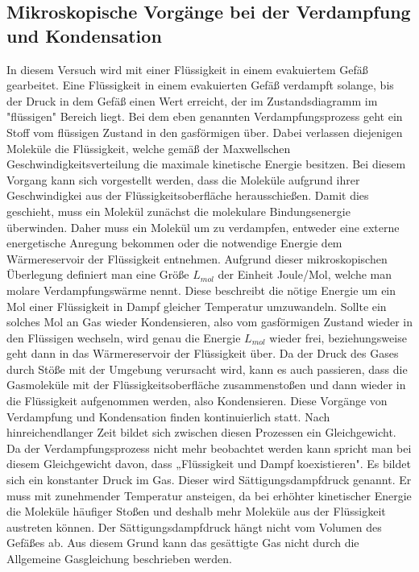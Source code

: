 \subsection{Mikroskopische Vorgänge bei der Verdampfung und Kondensation}
\label{subsec:T_VK}
In diesem Versuch wird mit einer Flüssigkeit in einem evakuiertem Gefäß gearbeitet. Eine Flüssigkeit in einem evakuierten Gefäß verdampft solange, bis der Druck in dem Gefäß einen Wert erreicht,
der im Zustandsdiagramm im "flüssigen"\: Bereich liegt. Bei dem eben genannten Verdampfungsprozess
geht ein Stoff vom flüssigen Zustand in den gasförmigen über. Dabei verlassen diejenigen Moleküle die Flüssigkeit, welche gemäß der Maxwellschen Geschwindigkeitsverteilung die maximale kinetische 
Energie besitzen. Bei diesem Vorgang kann sich vorgestellt werden, dass die Moleküle aufgrund ihrer Geschwindigkei aus der Flüssigkeitsoberfläche herausschießen. Damit dies geschieht, muss
ein Molekül zunächst die molekulare Bindungsenergie überwinden. Daher muss ein Molekül um zu verdampfen, entweder eine externe energetische Anregung bekommen oder die notwendige Energie
dem Wärmereservoir der Flüssigkeit entnehmen. Aufgrund dieser mikroskopischen Überlegung definiert man eine Größe $L_{mol}$ der Einheit Joule/Mol, welche man molare Verdampfungswärme nennt. Diese beschreibt die nötige Energie
um ein Mol einer Flüssigkeit in Dampf gleicher Temperatur umzuwandeln. Sollte ein solches Mol an Gas wieder Kondensieren, also vom gasförmigen Zustand wieder in den Flüssigen wechseln, wird genau
die Energie $L_{mol}$ wieder frei, beziehungsweise geht dann in das Wärmereservoir der Flüssigkeit über. Da der Druck des Gases durch Stöße mit der Umgebung verursacht wird, kann es auch passieren, dass
die Gasmoleküle mit der Flüssigkeitsoberfläche zusammenstoßen und dann wieder in die Flüssigkeit aufgenommen werden, also Kondensieren. Diese Vorgänge von Verdampfung und 
Kondensation finden kontinuierlich statt.
Nach hinreichendlanger Zeit bildet sich zwischen diesen Prozessen ein Gleichgewicht. Da der Verdampfungsprozess nicht mehr beobachtet werden kann spricht man bei diesem Gleichgewicht
davon, dass „Flüssigkeit und Dampf koexistieren". Es bildet sich ein konstanter Druck im Gas. Dieser wird Sättigungsdampfdruck genannt. Er muss mit zunehmender Temperatur ansteigen, da bei
erhöhter kinetischer Energie die Moleküle häufiger Stoßen und deshalb mehr Moleküle aus der Flüssigkeit austreten können. Der Sättigungsdampfdruck hängt nicht vom Volumen des Gefäßes ab. 
Aus diesem Grund kann das gesättigte Gas nicht durch die Allgemeine Gasgleichung beschrieben werden.
